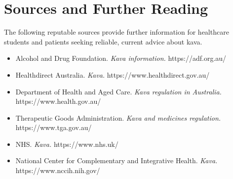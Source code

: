 \section*{Sources and Further Reading}
The following reputable sources provide further information for healthcare students and patients seeking reliable, current advice about kava.
\begin{itemize}
    \item Alcohol and Drug Foundation. \textit{Kava information.} https://adf.org.au/
    \item Healthdirect Australia. \textit{Kava.} https://www.healthdirect.gov.au/
    \item Department of Health and Aged Care. \textit{Kava regulation in Australia.} https://www.health.gov.au/
    \item Therapeutic Goods Administration. \textit{Kava and medicines regulation.} https://www.tga.gov.au/
    \item NHS. \textit{Kava.} https://www.nhs.uk/
    \item National Center for Complementary and Integrative Health. \textit{Kava.} https://www.nccih.nih.gov/
\end{itemize}
